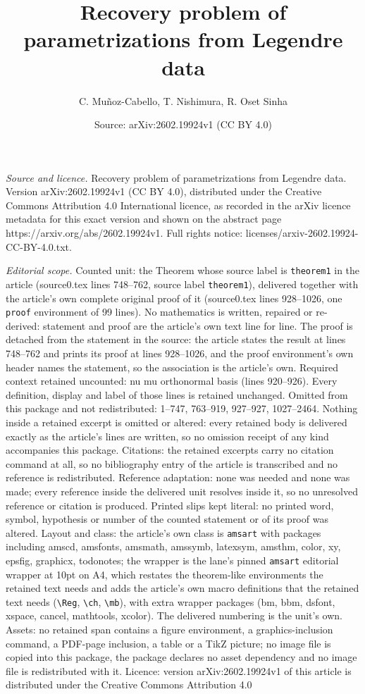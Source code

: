 \documentclass[10pt,a4paper]{amsart}
\title[Recovery problem of parametrizations from Legendre data]{Recovery problem of parametrizations from Legendre data}
\author{C. Mu\~noz-Cabello, T. Nishimura, R. Oset Sinha}
\date{Source: arXiv:2602.19924v1 (CC BY 4.0)}
\begin{document}
\maketitle

\noindent\emph{Source and licence.} Recovery problem of parametrizations from Legendre data. Version arXiv:2602.19924v1 (CC BY 4.0), distributed under the Creative Commons Attribution 4.0 International licence, as recorded in the arXiv licence metadata for this exact version and shown on the abstract page https://arxiv.org/abs/2602.19924v1. Full rights notice: licenses/arxiv-2602.19924-CC-BY-4.0.txt.\par\smallskip

\noindent\textit{Editorial scope.} Counted unit: the Theorem whose source label is \texttt{theorem1} in the article (source0.tex lines 748--762, source label \texttt{theorem1}), delivered together with the article's own complete original proof of it (source0.tex lines 928--1026, one \texttt{proof} environment of 99 lines). No mathematics is written, repaired or re-derived: statement and proof are the article's own text line for line. The proof is detached from the statement in the source: the article states the result at lines 748--762 and prints its proof at lines 928--1026, and the proof environment's own header names the statement, so the association is the article's own. Required context retained uncounted: nu mu orthonormal basis (lines 920--926). Every definition, display and label of those lines is retained unchanged. Omitted from this package and not redistributed: 1--747, 763--919, 927--927, 1027--2464. Nothing inside a retained excerpt is omitted or altered: every retained body is delivered exactly as the article's lines are written, so no omission receipt of any kind accompanies this package. Citations: the retained excerpts carry no citation command at all, so no bibliography entry of the article is transcribed and no reference is redistributed. Reference adaptation: none was needed and none was made; every reference inside the delivered unit resolves inside it, so no unresolved reference or citation is produced. Printed slips kept literal: no printed word, symbol, hypothesis or number of the counted statement or of its proof was altered. Layout and class: the article's own class is \texttt{amsart} with packages including amscd, amsfonts, amsmath, amssymb, latexsym, amsthm, color, xy, epsfig, graphicx, todonotes; the wrapper is the lane's pinned \texttt{amsart} editorial wrapper at 10pt on A4, which restates the theorem-like environments the retained text needs and adds the article's own macro definitions that the retained text needs (\texttt{\textbackslash Reg}, \texttt{\textbackslash ch}, \texttt{\textbackslash mb}), with extra wrapper packages (bm, bbm, dsfont, xspace, cancel, mathtools, xcolor). The delivered numbering is the unit's own. Assets: no retained span contains a figure environment, a graphics-inclusion command, a PDF-page inclusion, a table or a TikZ picture; no image file is copied into this package, the package declares no asset dependency and no image file is redistributed with it. Licence: version arXiv:2602.19924v1 of this article is distributed under the Creative Commons Attribution 4.0 
\end{document}
